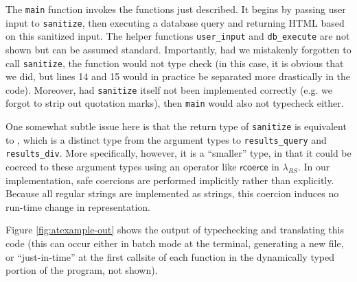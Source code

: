 \documentclass[10pt]{sigplanconf}
\theoremstyle{definition}
\begin{document}
The \verb|main| function invokes the functions just described. It begins by passing  user input to \verb|sanitize|, then executing a database query and returning HTML based on this sanitized input. The helper functions \verb|user_input| and \verb|db_execute| are not shown but can be assumed standard. Importantly, had we mistakenly forgotten to call \verb|sanitize|, the function would not type check (in this case, it is obvious that we did, but lines 14 and 15 would in practice be separated more drastically in the code). Moreover, had \verb|sanitize| itself not been implemented correctly (e.g. we forgot to strip out quotation marks), then \verb|main| would also not typecheck either.

One somewhat subtle issue here is that the return type of \verb|sanitize| is equivalent to , which is a distinct type from the argument types to \verb|results_query| and \verb|results_div|. More specifically, however, it is a ``smaller'' type, in that it could be coerced to these argument types using an operator like $\textsf{rcoerce}$ in $\lambda_{RS}$. In our implementation, safe coercions are performed implicitly rather than explicitly. Because all regular strings are implemented as strings, this coercion induces no run-time change in representation. 




Figure \ref{fig:atexample-out} shows the output of typechecking and translating this code (this can occur either in batch mode at the terminal, generating a new file, or ``just-in-time'' at the first callsite of each function in the dynamically typed portion of the program, not shown). 
\end{document}

